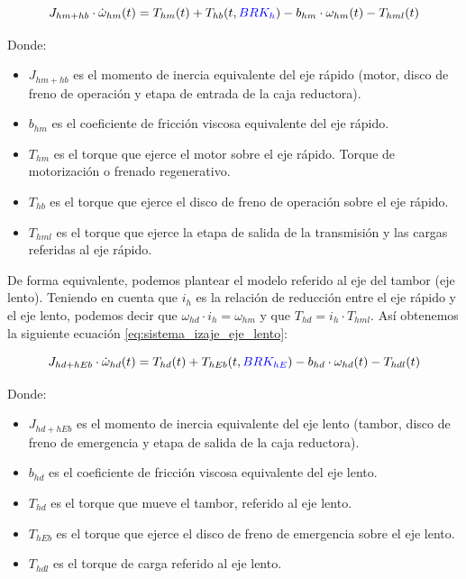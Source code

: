 \documentclass[11pt]{article}
\begin{document}
\begin{equation}
	\label{eq:sistema_izaje_eje_rapido}
	J_{hm+hb}\cdot\dot{\omega}_{hm}(t)=T_{hm}(t)+T_{hb}(t,{\color{blue}BRK_{h}})-b_{hm}\cdot\omega_{hm}(t)-T_{hml}(t)
\end{equation}

Donde:

\begin{itemize}
	\item $J_{hm+hb}$ es el momento de inercia equivalente del eje rápido (motor, disco de freno de operación y etapa de entrada de la caja reductora).
	\item $b_{hm}$ es el coeficiente de fricción viscosa equivalente del eje rápido.
	\item $T_{hm}$ es el torque que ejerce el motor sobre el eje rápido. Torque de motorización o frenado regenerativo.
	\item $T_{hb}$ es el torque que ejerce el disco de freno de operación sobre el eje rápido.
	\item $T_{hml}$ es el torque que ejerce la etapa de salida de la transmisión y las cargas referidas al eje rápido.
\end{itemize}

De forma equivalente, podemos plantear el modelo referido al eje del tambor (eje lento). Teniendo en cuenta que $i_{h}$ es la relación de reducción entre el eje rápido y el eje lento, podemos decir que $\omega_{hd}\cdot i_{h}=\omega_{hm}$ y que $T_{hd}=i_{h}\cdot T_{hml}$.
Así obtenemos la siguiente ecuación \ref{eq:sistema_izaje_eje_lento}:

\begin{equation}
	\label{eq:sistema_izaje_eje_lento}
	J_{hd+hEb}\cdot\dot{\omega}_{hd}(t)=T_{hd}(t)+T_{hEb}(t,{\color{blue}BRK_{hE}})-b_{hd}\cdot\omega_{hd}(t)-T_{hdl}(t)
\end{equation}

Donde:

\begin{itemize}
	\item $J_{hd+hEb}$ es el momento de inercia equivalente del eje lento (tambor, disco de freno de emergencia y etapa de salida de la caja reductora).
	\item $b_{hd}$ es el coeficiente de fricción viscosa equivalente del eje lento.
	\item $T_{hd}$ es el torque que mueve el tambor, referido al eje lento.
	\item $T_{hEb}$ es el torque que ejerce el disco de freno de emergencia sobre el eje lento.
	\item $T_{hdl}$ es el torque de carga referido al eje lento.
\end{itemize}
\end{document}
